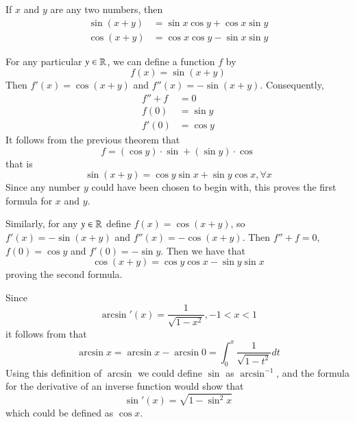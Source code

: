 \documentclass[12pt]{report}
\begin{document}
\begin{subappendices}
    \begin{thm}{}{}
        If $x$ and $y$ are any two numbers, then \begin{align*}
            \sin(x+y) &= \sin x\cos y + \cos x \sin y \\
            \cos(x+y) &= \cos x\cos y - \sin x \sin y
        \end{align*}
    \end{thm}
    \begin{proof*}{}{}
        For any particular $y \in \mathbb R$, we can define a function $f$ by \begin{equation*}
            f(x) = \sin(x+y)
        \end{equation*}
        Then $f'(x) = \cos(x+y)$ and $f''(x) = -\sin(x+y)$. Consequently, \begin{align*}
            f'' + f &= 0 \\
            f(0) &= \sin y \\
            f'(0) &= \cos y
        \end{align*}
        It follows from the previous theorem that \begin{equation*}
            f = (\cos y)\cdot \sin + (\sin y) \cdot \cos
        \end{equation*}
        that is \begin{equation*}
            \sin(x+y) = \cos y\sin x+\sin y \cos x,\forall x
        \end{equation*}
        Since any number $y$ could have been chosen to begin with, this proves the first formula for $x$ and $y$.


        Similarly, for any $y \in \mathbb R$ define $f(x) = \cos(x+y)$, so $f'(x) = -\sin(x+y)$ and $f''(x) = -\cos(x+y)$. Then $f'' + f = 0$, $f(0) = \cos y$ and $f'(0) = -\sin y$. Then we have that \begin{equation*}
            \cos(x+y) = \cos y\cos x - \sin y \sin x
        \end{equation*}
        proving the second formula.
    \end{proof*}

    \begin{rmk}{}{}
        Since \begin{equation*}
            \arcsin'(x) = \frac{1}{\sqrt{1-x^2}}, -1 < x < 1
        \end{equation*}
        it follows from  that \begin{equation*}
            \arcsin x = \arcsin x - \arcsin 0 = \int_0^x\frac{1}{\sqrt{1-t^2}}dt
        \end{equation*}
        Using this definition of $\arcsin$ we could define $\sin$ as $\arcsin^{-1}$, and the formula for the derivative of an inverse function would show that \begin{equation*}
            \sin'(x) = \sqrt{1-\sin^2 x}
        \end{equation*}
        which could be defined as $\cos x$.
    \end{rmk}



\end{subappendices}
\end{document}
